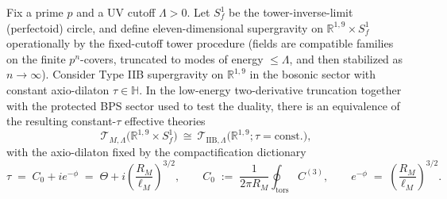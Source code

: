 \documentclass[10pt,a4paper]{amsart}
\begin{document}
\begin{theorem}\label{thm:perfectoid_M_IIB_constant_tau}
Fix a prime $p$ and a UV cutoff $\Lambda>0$. Let $S_f^{1}$ be the tower-inverse-limit (perfectoid) circle, and define eleven-dimensional supergravity on $\mathbb{R}^{1,9}\times S_f^{1}$ operationally by the fixed-cutoff tower procedure (fields are compatible families on the finite $p^n$-covers, truncated to modes of energy $\le\Lambda$, and then stabilized as $n\to\infty$). Consider Type IIB supergravity on $\mathbb{R}^{1,9}$ in the bosonic sector with constant axio-dilaton $\tau\in\mathbb{H}$. In the low-energy two-derivative truncation together with the protected BPS sector used to test the duality, there is an equivalence of the resulting constant-$\tau$ effective theories
\begin{equation}\label{eq:thm_duality_correct}
\mathcal{T}_{M,\Lambda}\bigl(\mathbb{R}^{1,9}\times S_f^{1}\bigr)\ \cong\ \mathcal{T}_{\mathrm{IIB},\Lambda}\bigl(\mathbb{R}^{1,9};\tau=\mathrm{const.}\bigr),
\end{equation}
with the axio-dilaton fixed by the compactification dictionary
\begin{equation}\label{eq:tau_main_correct}
\tau \;=\; C_0 + i e^{-\phi}\;=\;\Theta + i\left(\frac{R_M}{\ell_M}\right)^{3/2},
\qquad
C_0 \;:=\; \frac{1}{2\pi R_M}\oint_{\mathrm{tors}} C^{(3)},\qquad
e^{-\phi}\;=\;\left(\frac{R_M}{\ell_M}\right)^{3/2}.
\end{equation}
\end{theorem}
\end{document}

